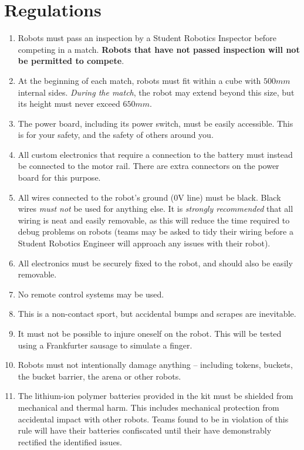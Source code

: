 \section {Regulations}
\label{sec:Regulations}

\begin{enumerate}
\item Robots must pass an inspection by a Student Robotics Inspector before competing in a match.
 \textbf{Robots that have not passed inspection will not be permitted to compete}.
\item At the beginning of each match, robots must fit within a cube with $500mm$ internal sides.  \textit{During the match}, the robot may extend beyond this size, but its height must never exceed $650mm$.
\item The power board, including its power switch, must be easily accessible.
 This is for your safety, and the safety of others around you.
\item All custom electronics that require a connection to the battery must instead be connected to the motor rail.
 There are extra connectors on the power board for this purpose.
\item All wires connected to the robot's ground (0V line) must be black.
 Black wires \emph{must not} be used for anything else.
 It is \emph{strongly recommended} that all wiring is neat and easily removable, as this will reduce the time required to debug problems on robots
  (teams may be asked to tidy their wiring before a Student Robotics Engineer will approach any issues with their robot).
\item All electronics must be securely fixed to the robot, and should also be easily removable.
\item No remote control systems may be used.
\item This is a non-contact sport, but accidental bumps and scrapes are inevitable.
\item It must not be possible to injure oneself on the robot.
 This will be tested using a Frankfurter sausage to simulate a finger.
\item Robots must not intentionally damage anything -- including tokens, buckets, the bucket barrier, the arena or other robots.

\item The lithium-ion polymer batteries provided in the kit must be shielded from mechanical and thermal harm.  This includes mechanical protection from accidental impact with other robots.  Teams found to be in violation of this rule will have their batteries confiscated until their have demonstrably rectified the identified issues.


\end{enumerate}
